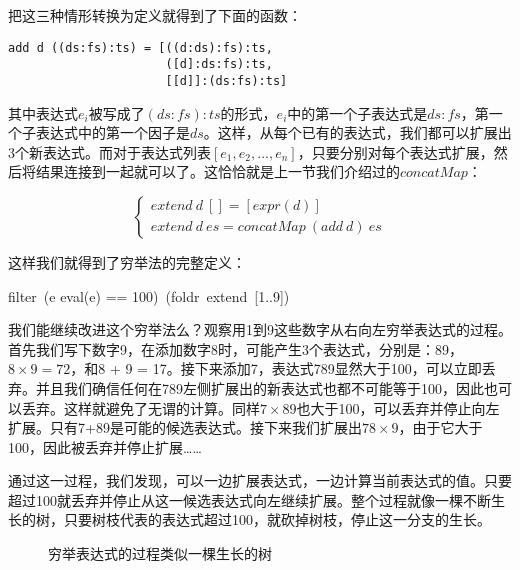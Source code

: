 \documentclass{article}
\begin{document}
把这三种情形转换为定义就得到了下面的函数：

\lstset{frame = none}
\begin{lstlisting}
add d ((ds:fs):ts) = [((d:ds):fs):ts,
                      ([d]:ds:fs):ts,
                      [[d]]:(ds:fs):ts]
\end{lstlisting}

其中表达式$e_i$被写成了$(ds:fs):ts$的形式，$e_i$中的第一个子表达式是$ds:fs$，第一个子表达式中的第一个因子是$ds$。这样，从每个已有的表达式，我们都可以扩展出3个新表达式。而对于表达式列表$[e_1, e_2, ..., e_n]$，只要分别对每个表达式扩展，然后将结果连接到一起就可以了。这恰恰就是上一节我们介绍过的$concatMap$：

\[
\begin{cases}
extend\ d\ [] = [expr(d)] \\
extend\ d\ es = concatMap\ (add\ d)\ es
\end{cases}
\]

这样我们就得到了穷举法的完整定义：

\be
filter\ (e \mapsto eval(e) == 100)\ (foldr\ extend\ [1..9])
\label{eq:puzzle100-basic}
\ee

我们能继续改进这个穷举法么？观察用1到9这些数字从右向左穷举表达式的过程。首先我们写下数字9，在添加数字8时，可能产生3个表达式，分别是：89，$8 \times 9 = 72$，和8 + 9 = 17。接下来添加7，表达式789显然大于100，可以立即丢弃。并且我们确信任何在789左侧扩展出的新表达式也都不可能等于100，因此也可以丢弃。这样就避免了无谓的计算。同样$7 \times 89$也大于100，可以丢弃并停止向左扩展。只有7+89是可能的候选表达式。接下来我们扩展出$78 \times 9$，由于它大于100，因此被丢弃并停止扩展……

通过这一过程，我们发现，可以一边扩展表达式，一边计算当前表达式的值。只要超过100就丢弃并停止从这一候选表达式向左继续扩展。整个过程就像一棵不断生长的树，只要树枝代表的表达式超过100，就砍掉树枝，停止这一分支的生长。

\begin{figure}[htbp]
\centering
{}
\caption{穷举表达式的过程类似一棵生长的树}
\end{figure}
\end{document}
